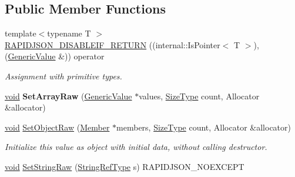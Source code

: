 \subsection*{Public Member Functions}
\begin{DoxyCompactItemize}
\item 
{\footnotesize template$<$typename T $>$ }\\\hyperlink{class_generic_value_a4a4418a93777942e1fb7ea71f8aaf680}{R\+A\+P\+I\+D\+J\+S\+O\+N\+\_\+\+D\+I\+S\+A\+B\+L\+E\+I\+F\+\_\+\+R\+E\+T\+U\+R\+N} ((internal\+::\+Is\+Pointer$<$ T $>$),(\hyperlink{class_generic_value}{Generic\+Value} \&)) operator
\begin{DoxyCompactList}\small\item\em Assignment with primitive types. \end{DoxyCompactList}\item 
\hypertarget{class_generic_value_a8f5f309065479de40a16cf28a340da65}{}\hyperlink{_s_d_l__audio_8h_a52835ae37c4bb905b903cbaf5d04b05f}{void} {\bfseries Set\+Array\+Raw} (\hyperlink{class_generic_value}{Generic\+Value} $\ast$values, \hyperlink{rapidjson_8h_a5ed6e6e67250fadbd041127e6386dcb5}{Size\+Type} count, Allocator \&allocator)\label{class_generic_value_a8f5f309065479de40a16cf28a340da65}

\item 
\hypertarget{class_generic_value_a26c8ec7d68858df1038506df7fcff22d}{}\hyperlink{_s_d_l__audio_8h_a52835ae37c4bb905b903cbaf5d04b05f}{void} \hyperlink{class_generic_value_a26c8ec7d68858df1038506df7fcff22d}{Set\+Object\+Raw} (\hyperlink{class_generic_value_a7ccf27c44058b4c11c3efc6473afb886}{Member} $\ast$members, \hyperlink{rapidjson_8h_a5ed6e6e67250fadbd041127e6386dcb5}{Size\+Type} count, Allocator \&allocator)\label{class_generic_value_a26c8ec7d68858df1038506df7fcff22d}

\begin{DoxyCompactList}\small\item\em Initialize this value as object with initial data, without calling destructor. \end{DoxyCompactList}\item 
\hypertarget{class_generic_value_a1451603922dcdf34976f125dc60f70ee}{}\hyperlink{_s_d_l__audio_8h_a52835ae37c4bb905b903cbaf5d04b05f}{void} \hyperlink{class_generic_value_a1451603922dcdf34976f125dc60f70ee}{Set\+String\+Raw} (\hyperlink{class_generic_value_a32e0f30ee278072374c8168b14d3317f}{String\+Ref\+Type} s) R\+A\+P\+I\+D\+J\+S\+O\+N\+\_\+\+N\+O\+E\+X\+C\+E\+P\+T\label{class_generic_value_a1451603922dcdf34976f125dc60f70ee}


\end{DoxyCompactItemize}
